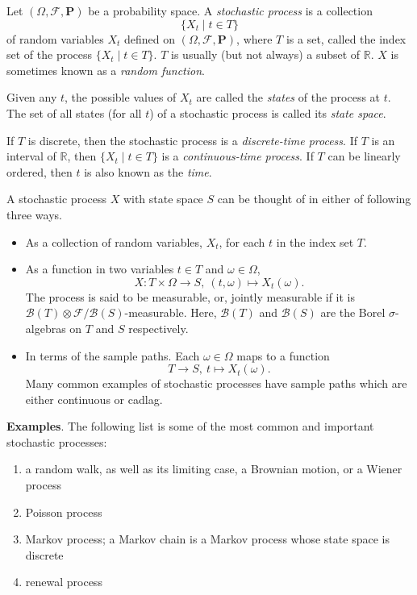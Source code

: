 \documentclass[12pt]{article}
\begin{document}
Let $(\Omega,\mathcal{F},\textbf{P})$ be a probability space. A
\emph{stochastic process} is a collection $$\lbrace X_t \mid t\in T
\rbrace$$ of random variables $X_t$ defined on
$(\Omega,\mathcal{F},\textbf{P})$, where $T$ is a set, called the
index set of the process $\lbrace X_t \mid t\in T \rbrace$. $T$ is
usually (but not always) a subset of $\mathbb{R}$. 
  $X$ is sometimes known as a \emph{random function}.
\par
Given any $t$, the possible values of $X_t$ are called the
\emph{states} of the process at $t$. The set of all states (for all
$t$) of a stochastic process is called its \emph{state space}.
\par
If $T$ is discrete, then the stochastic process is a
\emph{discrete-time process}. If $T$ is an interval of $\mathbb{R}$,
then $\lbrace X_t \mid t\in T \rbrace$ is a \emph{continuous-time
process}. If $T$ can be linearly ordered, then $t$ is also known as
the \emph{time}.
  
A stochastic process $X$ with state space $S$ can be thought of in either of following three ways.

\begin{itemize}
\item As a collection of random variables, $X_t$, for each $t$ in the index set $T$.
\item
As a function in two variables $t\in T$ and $\omega\in\Omega$,
\begin{equation*}
X\colon T\times\Omega\rightarrow S,\ (t,\omega)\mapsto X_t(\omega).
\end{equation*}
The process is said to be measurable, or, jointly measurable if it is $\mathcal{B}(T)\otimes\mathcal{F}/\mathcal{B}(S)$-measurable. Here, $\mathcal{B}(T)$ and $\mathcal{B}(S)$ are the Borel $\sigma$-algebras on $T$ and $S$ respectively.
\item In terms of the sample paths. Each $\omega\in\Omega$ maps to a function
\begin{equation*}
T\rightarrow S,\ t\mapsto X_t(\omega).
\end{equation*}
Many common examples of stochastic processes have sample paths which are either continuous or cadlag.
\end{itemize}

\textbf{Examples}. The following list is some of the most common and
important stochastic processes:
\begin{enumerate}
\item a random walk, as well as its limiting case, a Brownian motion, or a Wiener process
\item Poisson process
\item Markov process; a Markov chain is a Markov process whose state space is discrete
\item renewal process
\end{enumerate}
\end{document}
